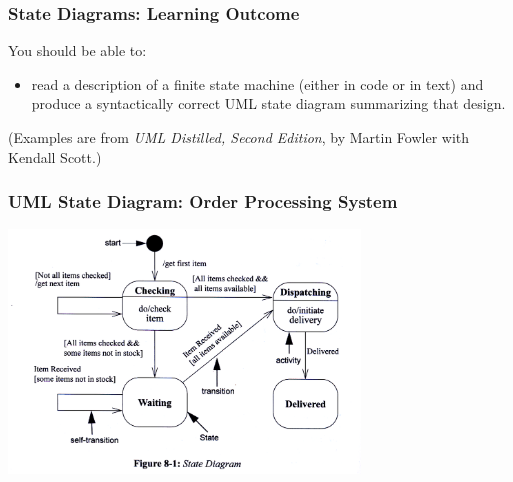 \begin{frame}

\frametitle{State Diagrams: Learning Outcome} 

\begin{changemargin}{1cm}

You should be able to:
\begin{itemize}
\item read a description of
a finite state machine (either in code or in text) and produce a
syntactically correct UML state diagram summarizing that design.
\end{itemize}

(Examples are from \emph{UML Distilled, Second
  Edition}, by Martin Fowler with Kendall Scott.)
\end{changemargin}

\end{frame}

\begin{frame}

\frametitle{UML State Diagram: Order Processing System}


\begin{center}
\includegraphics[width=0.7\textwidth]{images/statediagram1}
\end{center} 

\end{frame}

